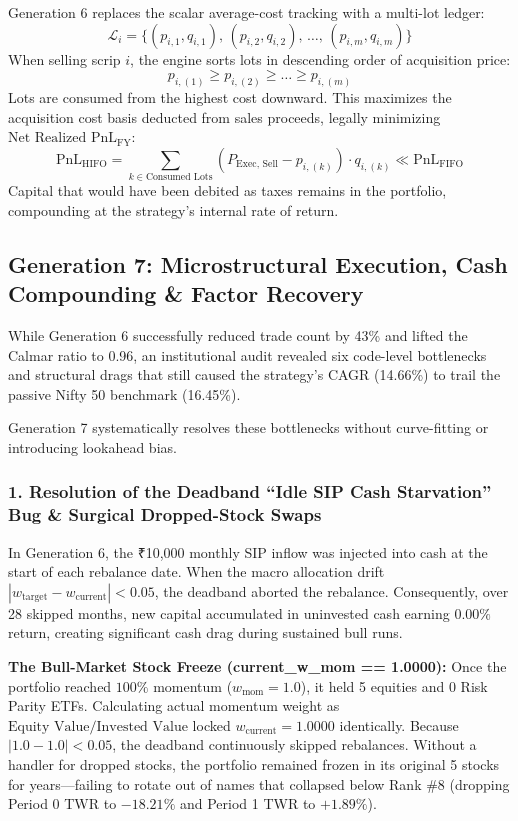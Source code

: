 \documentclass[11pt,a4paper]{article}
\begin{document}
Generation 6 replaces the scalar average-cost tracking with a multi-lot ledger:
\begin{equation}
\mathcal{L}_i = \big\{ (p_{i, 1}, q_{i, 1}), \, (p_{i, 2}, q_{i, 2}), \, \dots, \, (p_{i, m}, q_{i, m}) \big\}
\end{equation}
When selling scrip $i$, the engine sorts lots in descending order of acquisition price:
\begin{equation}
p_{i, (1)} \ge p_{i, (2)} \ge \dots \ge p_{i, (m)}
\end{equation}
Lots are consumed from the highest cost downward. This maximizes the acquisition cost basis deducted from sales proceeds, legally minimizing $\text{Net Realized PnL}_{\text{FY}}$:
\begin{equation}
\text{PnL}_{\text{HIFO}} = \sum_{k \in \text{Consumed Lots}} \left( P_{\text{Exec, Sell}} - p_{i, (k)} \right) \cdot q_{i, (k)} \ll \text{PnL}_{\text{FIFO}}
\end{equation}
Capital that would have been debited as taxes remains in the portfolio, compounding at the strategy's internal rate of return.

\subsection{Generation 7: Microstructural Execution, Cash Compounding \& Factor Recovery}
While Generation 6 successfully reduced trade count by 43\% and lifted the Calmar ratio to 0.96, an institutional audit revealed six code-level bottlenecks and structural drags that still caused the strategy's CAGR (14.66\%) to trail the passive Nifty 50 benchmark (16.45\%). 

Generation 7 systematically resolves these bottlenecks without curve-fitting or introducing lookahead bias.

\subsubsection{1. Resolution of the Deadband ``Idle SIP Cash Starvation'' Bug \& Surgical Dropped-Stock Swaps}
In Generation 6, the ₹10,000 monthly SIP inflow was injected into cash at the start of each rebalance date. When the macro allocation drift $|w_{\text{target}} - w_{\text{current}}| < 0.05$, the deadband aborted the rebalance. Consequently, over 28 skipped months, new capital accumulated in uninvested cash earning $0.00\%$ return, creating significant cash drag during sustained bull runs.

\textbf{The Bull-Market Stock Freeze (current\_w\_mom == 1.0000):} Once the portfolio reached $100\%$ momentum ($w_{\text{mom}} = 1.0$), it held 5 equities and 0 Risk Parity ETFs. Calculating actual momentum weight as $\text{Equity Value} / \text{Invested Value}$ locked $w_{\text{current}} = 1.0000$ identically. Because $|1.0 - 1.0| < 0.05$, the deadband continuously skipped rebalances. Without a handler for dropped stocks, the portfolio remained frozen in its original 5 stocks for years—failing to rotate out of names that collapsed below Rank \#8 (dropping Period 0 TWR to $-18.21\%$ and Period 1 TWR to $+1.89\%$).
\end{document}
